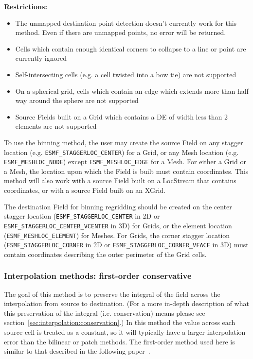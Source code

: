 \smallskip

{\bf Restrictions:}
\begin{itemize}
 \item The unmapped destination point detection doesn't currently work for this method. Even if there are unmapped points, no error will be returned. 
 \item Cells which contain enough identical corners to collapse to a line or point are currently ignored
 \item Self-intersecting cells (e.g. a cell twisted into a bow tie) are not supported 
 \item On a spherical grid, cells which contain an edge which extends more than half way around the sphere are not supported 
 \item Source Fields built on a Grid which contains a DE of width less than 2 elements are not supported
 \end{itemize}

 To use the binning method, the user may create the source Field on any stagger location (e.g. {\tt ESMF\_STAGGERLOC\_CENTER}) for a Grid, or
 any Mesh location (e.g. {\tt ESMF\_MESHLOC\_NODE}) except {\tt ESMF\_MESHLOC\_EDGE} for a Mesh. For either a Grid or a Mesh, the location upon which the
 Field is built must contain coordinates. This method will also work with a source Field built on a LocStream that contains coordinates, 
 or with a source Field built on an XGrid.

 The destination Field for binning regridding should be created on the center stagger location ({\tt ESMF\_STAGGERLOC\_CENTER} in 2D or {\tt ESMF\_STAGGERLOC\_CENTER\_VCENTER} in 3D) for Grids, or the element location ({\tt ESMF\_MESHLOC\_ELEMENT}) for Meshes. For Grids, the corner stagger location ({\tt ESMF\_STAGGERLOC\_CORNER} in 2D or {\tt ESMF\_STAGGERLOC\_CORNER\_VFACE} in 3D) must contain coordinates describing the outer perimeter of the Grid cells. 

\subsubsection{Interpolation methods: first-order conservative}\label{sec:interpolation:conserve}
 The goal of this method is to preserve the integral of the field across the interpolation from source to destination.  
 (For a more in-depth description of what this preservation of the integral (i.e. conservation) means please see section~\ref{sec:interpolation:conservation}.)  In this method the value across each source cell is treated as a constant, so it will typically have a larger 
 interpolation error than the bilinear or patch methods.  The first-order method used here is similar to that described in the following paper~\cite{ConservativeOrder1}.

